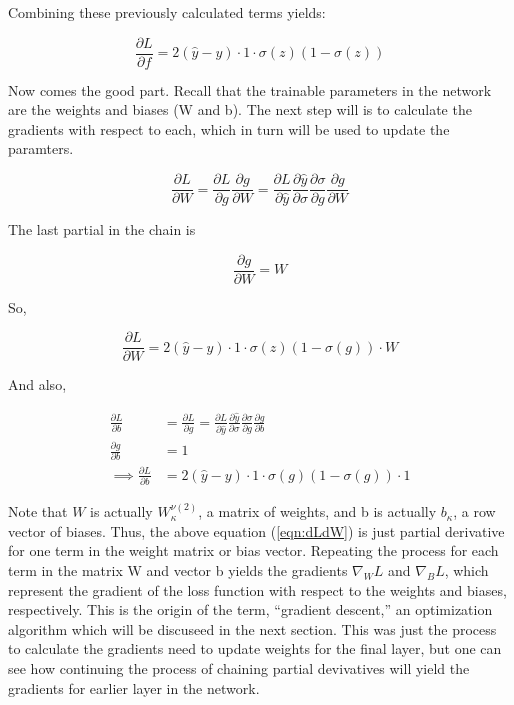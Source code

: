 \noindent Combining these previously calculated terms yields:

\begin{equation}
\frac{\partial L}{\partial f} = 2(\hat{y} - y ) \cdot 1 \cdot  \sigma(z)(1 - \sigma(z))
\end{equation}

Now comes the good part. Recall that the trainable parameters in the network are the weights and biases (W and b). The next step will is to calculate the gradients with respect to each, which in turn will be used to update the paramters.

\begin{equation}
\frac{\partial L}{\partial W} = \frac{\partial L}{\partial g}\frac{\partial g}{\partial W} = \frac{\partial L}{\partial \hat{y}} \frac{\partial \hat{y}}{\partial \sigma} \frac{\partial \sigma}{\partial g} \frac{\partial g}{\partial W}
\end{equation}

\noindent The last partial in the chain is

\begin{equation}
\frac{\partial g}{\partial W} = W
\end{equation}

So,

\begin{equation}
\frac{\partial L}{\partial W} = 2(\hat{y} - y ) \cdot 1 \cdot  \sigma(z)(1 - \sigma(g)) \cdot W
\end{equation}

And also,

\begin{align}
\label{eqn:dLdW}
\frac{\partial L}{\partial b} &= \frac{\partial L}{\partial g} = \frac{\partial L}{\partial \hat{y}} \frac{\partial \hat{y}}{\partial \sigma} \frac{\partial \sigma}{\partial g} \frac{\partial g}{\partial b} \\
\frac{\partial g}{\partial b} &= 1 \\
\implies \frac{\partial L}{\partial b} &= 2(\hat{y} - y ) \cdot 1 \cdot  \sigma(g)(1 - \sigma(g)) \cdot 1
\end{align}

Note that $ W $ is actually $ W_\kappa ^{\nu (2)} $, a matrix of weights, and b is actually $ b_\kappa $, a row vector of biases. Thus, the above equation (\ref{eqn:dLdW}) is just partial derivative for one term in the weight matrix or bias vector. Repeating the process for each term in the matrix W and vector b yields the gradients $ \nabla_W L $  and $ \nabla_BL $, which represent the gradient of the loss function with respect to the weights and biases, respectively. This is the origin of the term, ``gradient descent,'' an optimization algorithm which will be discuseed in the next section. This was just the process to calculate the gradients need to update weights for the final layer, but one can see how continuing the process of chaining partial devivatives will yield the gradients for earlier layer in the network.


